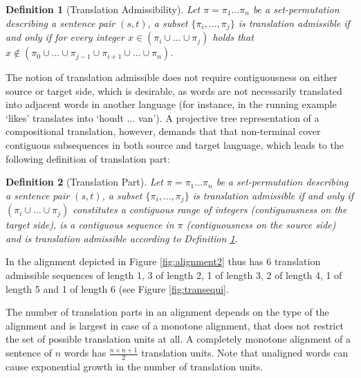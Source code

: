 \documentclass{report}
\theoremstyle{definition}
\theoremstyle{plain}
\newtheorem{definition}{Definition}
\begin{document}
\begin{definition}[Translation Admissibility]\label{def:transadd}
Let $\pi = \pi_1 \ldots \pi_n$ be a set-permutation describing a sentence pair $(s,t)$, a subset $\{\pi_i,\ldots,\pi_j\}$ is translation admissible if and only if for every integer $x \in (\pi_i\cup \ldots \cup\pi_j)$ holds that $x \notin (\pi_0\cup \ldots \cup \pi_{j-1} \cup \pi_{i+1}\cup\ldots\cup \pi_n)$.
\end{definition}

\noindent The notion of translation admissible does not require contiguousness on either source or target side, which is desirable, as words are not necessarily translated into adjacent words in another language (for instance, in the running example `likes' translates into `houdt ... van'). A projective tree representation of a compositional translation, however, demands that that non-terminal cover contiguous subsequences in both source and target language, which leads to the following definition of translation part:

\begin{definition}[Translation Part]\label{def:transpart}
Let $\pi = \pi_1 \ldots \pi_n$ be a set-permutation describing a sentence pair $(s,t)$, a subset $\{\pi_i,\ldots,\pi_j\}$ is translation admissible if and only if $(\pi_i\cup \ldots \cup \pi_j)$ constitutes a contiguous range of integers (contiguousness on the target side), is a contiguous sequence in $\pi$ (contiguousness on the source side) and is translation admissible according to Definition \ref{def:transadd}.
\end{definition}

\noindent In the alignment depicted in Figure \ref{fig:alignment2} thus has 6 translation admissible sequences of length 1, 3 of length 2, 1 of length 3, 2 of length 4, 1 of length 5 and 1 of length 6 (see Figure \ref{fig:transequi}.

The number of translation parts in an alignment depends on the type of the alignment and is largest in case of a monotone alignment, that does not restrict the set of possible translation units at all. A completely monotone alignment of a sentence of $n$ words has $\frac{n\times n+1}{2}$ translation units. Note that unaligned words can cause exponential growth in the number of translation units.
\end{document}
